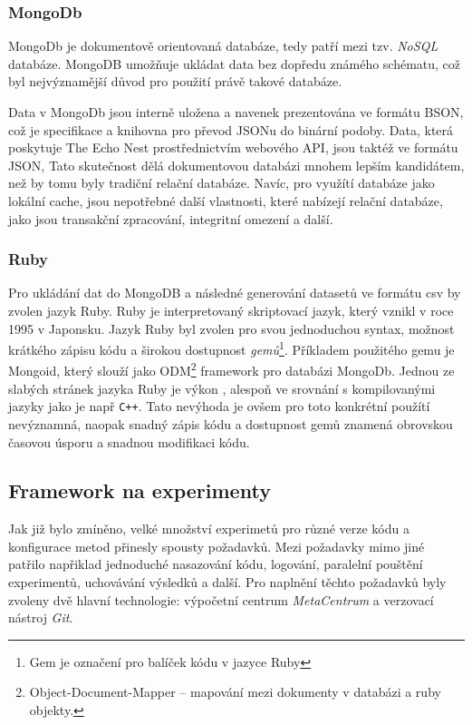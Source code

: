 \documentclass[thesis=M,czech]{FITthesis}[2012/06/26]
\begin{document}
\subsubsection*{MongoDb}
MongoDb je dokumentově orientovaná databáze, tedy patří mezi tzv. \textit{NoSQL} databáze. MongoDB umožňuje ukládat data bez dopředu známého schématu, což byl nejvýznamější důvod pro použití právě takové databáze.

Data v MongoDb jsou interně uložena a navenek prezentována ve formátu BSON, což je specifikace a knihovna pro převod JSONu do binární podoby. Data, která poskytuje The Echo Nest prostřednictvím webového API, jsou taktéž ve formátu JSON, Tato skutečnost dělá dokumentovou databázi mnohem lepším kandidátem, než by tomu byly tradiční relační databáze. Navíc, pro využítí databáze jako lokální cache, jsou nepotřebné další vlastnosti, které nabízejí relační databáze, jako jsou transakční zpracování, integritní omezení a další.

\subsubsection*{Ruby}
Pro ukládání dat do MongoDB a následné generování datasetů ve formátu csv by zvolen jazyk Ruby. Ruby je interpretovaný skriptovací jazyk, který vznikl v roce 1995 v Japonsku.
Jazyk Ruby byl zvolen pro svou jednoduchou syntax, možnost krátkého zápisu kódu a širokou dostupnost \textit{gemů}\footnote{Gem je označení pro balíček kódu v jazyce Ruby}. Příkladem použitého gemu je Mongoid, který slouží jako ODM\footnote{Object-Document-Mapper -- mapování mezi dokumenty v databázi a ruby objekty.} framework pro databázi MongoDb.
Jednou ze slabých stránek jazyka Ruby je výkon \cite{ruby_performance}, alespoň ve srovnání s kompilovanými jazyky jako je např \texttt{C++}. Tato nevýhoda je ovšem pro toto konkrétní použítí nevýznamná, naopak snadný zápis kódu a dostupnost gemů znamená obrovskou časovou úsporu a snadnou modifikaci kódu.


\subsection{Framework na experimenty}
Jak již bylo zmíněno, velké množství experimetů pro různé verze kódu a konfigurace metod přinesly spousty požadavků. Mezi požadavky mimo jiné patřilo napřiklad jednoduché nasazování kódu, logování, paralelní pouštění experimentů, uchovávání výsledků a další. Pro naplnění těchto požadavků byly zvoleny dvě hlavní technologie: výpočetní centrum \textit{MetaCentrum} a verzovací nástroj \textit{Git}.
\end{document}
